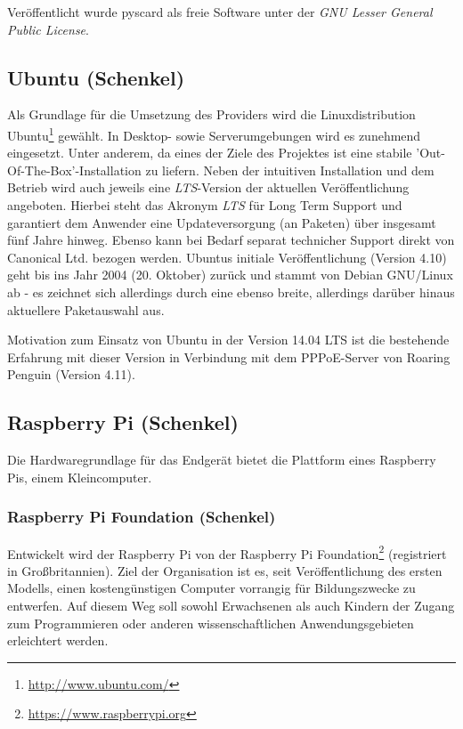 Veröffentlicht wurde pyscard als freie Software unter der
\textit{GNU Lesser General Public License}.

\subsection{Ubuntu (Schenkel)}
\label{subsec:ubuntu}
Als Grundlage für die Umsetzung des Providers wird die Linuxdistribution Ubuntu\footnote{\url{http://www.ubuntu.com/}}
gewählt. In Desktop- sowie Serverumgebungen wird es zunehmend eingesetzt.
Unter anderem, da eines der Ziele des Projektes ist eine stabile
'Out-Of-The-Box'-Installation zu liefern. Neben der intuitiven Installation und dem
Betrieb wird auch jeweils eine \textit{LTS}-Version der aktuellen Veröffentlichung angeboten.
Hierbei steht das Akronym \textit{LTS} für Long Term Support und garantiert dem Anwender eine
Updateversorgung (an Paketen) über insgesamt fünf Jahre hinweg. Ebenso kann bei
Bedarf separat technicher Support direkt von Canonical
Ltd. bezogen werden. Ubuntus initiale Veröffentlichung (Version 4.10) geht bis ins Jahr
2004 (20. Oktober) zurück und stammt von Debian GNU/Linux ab - es zeichnet sich
allerdings durch eine ebenso breite, allerdings darüber hinaus aktuellere Paketauswahl aus.

Motivation zum Einsatz von Ubuntu in der Version 14.04 LTS ist die bestehende Erfahrung
mit dieser Version in Verbindung mit dem PPPoE-Server von Roaring Penguin (Version 4.11). 

\subsection{Raspberry Pi (Schenkel)}

Die Hardwaregrundlage für das Endgerät bietet die Plattform eines Raspberry Pis, einem Kleincomputer.

\subsubsection{Raspberry Pi Foundation (Schenkel)}
Entwickelt wird der Raspberry Pi von der Raspberry Pi Foundation\footnote{\url{https://www.raspberrypi.org}}
(registriert in Großbritannien). Ziel der Organisation ist es,
seit Veröffentlichung des ersten Modells, einen kostengünstigen
Computer vorrangig für Bildungszwecke zu entwerfen. Auf diesem
Weg soll sowohl Erwachsenen als auch Kindern der Zugang zum
Programmieren oder anderen wissenschaftlichen Anwendungsgebieten
erleichtert werden.

